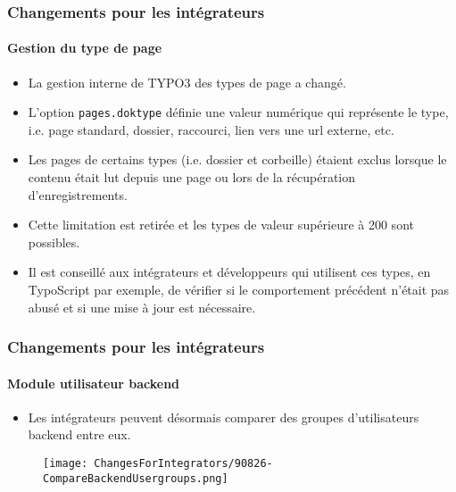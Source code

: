 \begin{frame}[fragile]
	\frametitle{Changements pour les intégrateurs}
	\framesubtitle{Gestion du type de page}

	\begin{itemize}
		\item La gestion interne de TYPO3 des types de page a changé.
		\item L'option \texttt{pages.doktype} définie une valeur numérique qui représente le type,
			i.e. page standard, dossier, raccourci, lien vers une url externe, etc.
		\item Les pages de certains types (i.e. dossier et corbeille) étaient exclus lorsque le contenu
			était lut depuis une page ou lors de la récupération d'enregistrements.
		\item Cette limitation est retirée et les types de valeur supérieure à 200 sont possibles.
		\item Il est conseillé aux intégrateurs et développeurs qui utilisent ces types, en TypoScript par exemple,
			de vérifier si le comportement précédent n'était pas abusé et si une mise à jour est nécessaire.
	\end{itemize}

\end{frame}


\begin{frame}[fragile]
	\frametitle{Changements pour les intégrateurs}
	\framesubtitle{Module utilisateur backend}

	\begin{itemize}
		\item Les intégrateurs peuvent désormais comparer des groupes d'utilisateurs backend entre eux.
	\end{itemize}

	\begin{figure}
		\texttt{[image: ChangesForIntegrators/90826-CompareBackendUsergroups.png]}
	\end{figure}

\end{frame}


